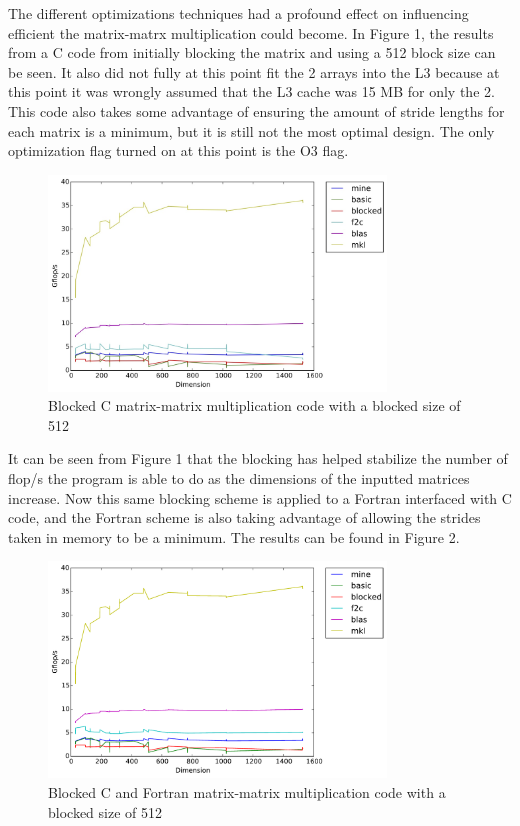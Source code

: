 \documentclass{article}
\begin{document}
The different optimizations techniques had a profound effect on influencing efficient the matrix-matrx multiplication could become. In Figure 1, the results from a C code from initially blocking the matrix and using a 512 block size  can be seen. It also did not fully at this point fit the 2 arrays into the L3 because at this point it was wrongly assumed that the L3 cache was 15 MB for only the 2. This code also takes some advantage of ensuring the amount of stride lengths for each matrix is a minimum, but it is still not the most optimal design. The only optimization flag turned on at this point is the O3 flag.

\begin{figure}[H]
  \centering
    \includegraphics[width=0.8\textwidth]{cblocked_no_opt_flags}
    \caption{Blocked C matrix-matrix multiplication code with a blocked size of 512}
\end{figure}

\noindent It can be seen from Figure 1 that the blocking has helped stabilize the number of flop/s the program is able to do as the dimensions of the inputted matrices increase. Now this same blocking scheme is applied to a Fortran interfaced with C code, and the Fortran scheme is also taking advantage of allowing the strides taken in memory to be a minimum. The results can be found in Figure 2.

\begin{figure}[H]
  \centering
    \includegraphics[width=0.8\textwidth]{c_f_blocked_no_opt_flags}
    \caption{Blocked C and Fortran matrix-matrix multiplication code with a blocked size of 512}
\end{figure}
\end{document}

